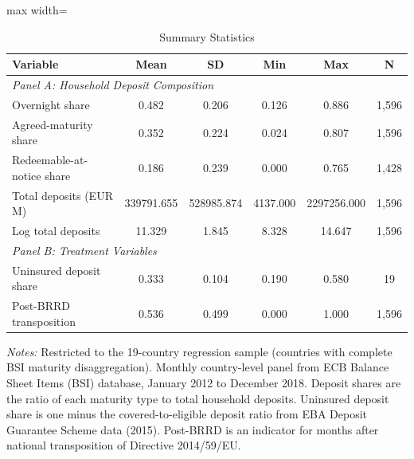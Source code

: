 \begin{table}[htbp]
\centering
\caption{Summary Statistics}
\label{tab:sumstats}
\begin{adjustbox}{max width=\textwidth}
\begin{tabular}{lccccc}
\toprule
Variable & Mean & SD & Min & Max & N \\
\midrule
\multicolumn{6}{l}{\textit{Panel A: Household Deposit Composition}} \\
Overnight share & 0.482 & 0.206 & 0.126 & 0.886 & 1,596 \\
Agreed-maturity share & 0.352 & 0.224 & 0.024 & 0.807 & 1,596 \\
Redeemable-at-notice share & 0.186 & 0.239 & 0.000 & 0.765 & 1,428 \\
Total deposits (EUR M) & 339791.655 & 528985.874 & 4137.000 & 2297256.000 & 1,596 \\
Log total deposits & 11.329 & 1.845 & 8.328 & 14.647 & 1,596 \\
\midrule
\multicolumn{6}{l}{\textit{Panel B: Treatment Variables}} \\
Uninsured deposit share & 0.333 & 0.104 & 0.190 & 0.580 &    19 \\
Post-BRRD transposition & 0.536 & 0.499 & 0.000 & 1.000 & 1,596 \\
\bottomrule
\end{tabular}
\end{adjustbox}
\begin{tablenotes}[flushleft]
\small
\item \textit{Notes:} Restricted to the 19-country regression sample (countries with complete BSI maturity disaggregation). Monthly country-level panel from ECB Balance Sheet Items (BSI) database, January 2012 to December 2018. Deposit shares are the ratio of each maturity type to total household deposits. Uninsured deposit share is one minus the covered-to-eligible deposit ratio from EBA Deposit Guarantee Scheme data (2015). Post-BRRD is an indicator for months after national transposition of Directive 2014/59/EU.
\end{tablenotes}
\end{table}

